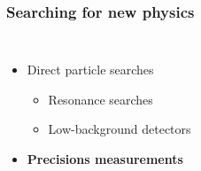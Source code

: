 \documentclass{beamer}
\begin{document}
	\begin{frame}
		\frametitle{Searching for new physics}

		\begin{columns}
			\begin{itemize}
				\item Direct particle searches
				\begin{itemize}
					\item Resonance searches

					\item Low-background detectors
				\end{itemize}

				\item<2-> \textbf{Precisions measurements}
			\end{itemize}

			\vspace{0.5cm}



\end{columns}
\end{frame}
\end{document}
